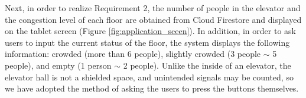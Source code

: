 Next, in order to realize Requirement 2, the number of people in the elevator and the congestion level of each floor are obtained from Cloud Firestore and displayed on the tablet screen (Figure \ref{fig:application_sceen}). In addition, in order to ask users to input the current status of the floor, the system displays the following information: crowded (more than 6 people), slightly crowded (3 people $\sim$ 5 people), and empty (1 person $\sim$ 2 people). Unlike the inside of an elevator, the elevator hall is not a shielded space, and unintended signals may be counted, so we have adopted the method of asking the users to press the buttons themselves.
